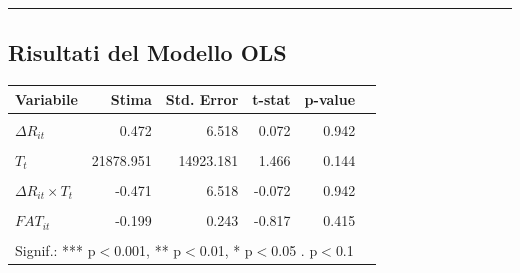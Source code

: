 \documentclass[
  letterpaper,
  DIV=11,
  numbers=noendperiod]{scrartcl}
\begin{document}
\begin{center}\rule{0.5\linewidth}{0.5pt}\end{center}

\subsection{Risultati del Modello OLS}\label{risultati-del-modello-ols}

\begin{table}[!h]
\centering\begingroup\fontsize{7}{9}\selectfont

\begin{tabular}{lrrrrl}
\toprule
\textbf{Variabile} & \textbf{Stima} & \textbf{Std. Error} & \textbf{t-stat} & \textbf{p-value} & \textbf{}\\
\midrule
\cellcolor{gray!10}{Intercetta} & \cellcolor{gray!10}{60398.438} & \cellcolor{gray!10}{4324.163} & \cellcolor{gray!10}{13.968} & \cellcolor{gray!10}{0.000} & \cellcolor{gray!10}{***}\\
$\Delta R_{it}$ & 0.472 & 6.518 & 0.072 & 0.942 & \\
\cellcolor{gray!10}{$C_i$} & \cellcolor{gray!10}{-12472.859} & \cellcolor{gray!10}{7826.110} & \cellcolor{gray!10}{-1.594} & \cellcolor{gray!10}{0.113} & \cellcolor{gray!10}{}\\
$T_t$ & 21878.951 & 14923.181 & 1.466 & 0.144 & \\
\cellcolor{gray!10}{$C_i \times T_t$} & \cellcolor{gray!10}{3454.051} & \cellcolor{gray!10}{10562.757} & \cellcolor{gray!10}{0.327} & \cellcolor{gray!10}{0.744} & \cellcolor{gray!10}{}\\
\addlinespace
$\Delta R_{it} \times T_t$ & -0.471 & 6.518 & -0.072 & 0.942 & \\
\cellcolor{gray!10}{$INF_{it}$} & \cellcolor{gray!10}{-1442.498} & \cellcolor{gray!10}{759.550} & \cellcolor{gray!10}{-1.899} & \cellcolor{gray!10}{0.059} & \cellcolor{gray!10}{.}\\
$FAT_{it}$ & -0.199 & 0.243 & -0.817 & 0.415 & \\
\cellcolor{gray!10}{$1/Dist_i$} & \cellcolor{gray!10}{-18667197.879} & \cellcolor{gray!10}{5448837.892} & \cellcolor{gray!10}{-3.426} & \cellcolor{gray!10}{0.001} & \cellcolor{gray!10}{***}\\
\bottomrule
\multicolumn{6}{l}{\rule{0pt}{1em}Signif.: *** p$<$0.001,  ** p$<$0.01,  * p$<$0.05 . p$<$0.1}\\
\end{tabular}
\endgroup{}
\end{table}
\end{document}
